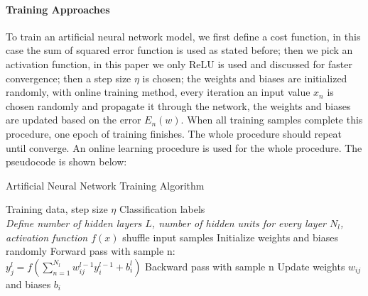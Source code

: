 \documentclass[conference]{IEEEtran}
\begin{document}
\paragraph{Training Approaches}
To train an artificial neural network model, we first define a cost function, in this case the sum of squared error function is used as stated before; then we pick an activation function, in this paper we only ReLU is used and discussed for faster convergence; then a step size $\eta$ is chosen; the weights and biases are initialized randomly, with online training method, every iteration an input value $x_n$ is chosen randomly and propagate it through the network, the weights and biases are updated based on the error $E_n(w)$. When all training samples complete this procedure, one epoch of training finishes. The whole procedure should repeat until converge. An online learning procedure is used for the whole procedure. The pseudocode is shown below:
\begin{algorithm}
    \caption{Artificial Neural Network Training Algorithm}
    \begin{algorithmic}[1]
        \renewcommand{\algorithmicrequire}{\textbf{Input:}}
        \renewcommand{\algorithmicensure}{\textbf{Output:}}
        \REQUIRE Training data, step size $\eta$
        \ENSURE  Classification labels
        \\ \textit{Define number of hidden layers $L$, number of hidden units for every layer $N_l$, activation function $f(x)$}
        \STATE shuffle input samples
        \STATE Initialize weights and biases randomly
        \STATE    Forward pass with sample n: \\
        $y_j^l = f(\sum_{n=1}^{N_l}w_{ij}^{l-1}y_i^{l-1}+b_i^l)$
        \STATE  Backward pass with sample n
        \STATE     Update weights $w_{ij}$ and biases $b_i$
        \ENDFOR
        \ENDFOR
    \end{algorithmic}
\end{algorithm}
\end{document}
